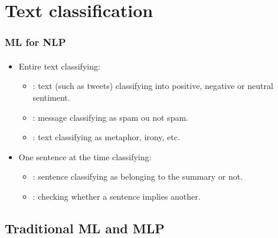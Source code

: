 \documentclass[xcolor=table]{beamer}
\begin{document}
	
	\section{Text classification}
	
	\begin{frame}
		\frametitle{ML for NLP}
		\framesubtitle{\insertsection}
		
		\begin{itemize}
			\item Entire text classifying:
			\begin{itemize}
				\item {}: text (such as tweets) classifying into positive, negative or neutral sentiment.
				\item {}: message classifying as spam ou not spam.
				\item {}: text classifying as metaphor, irony, etc.
			\end{itemize}
			\item One sentence at the time classifying:
			\begin{itemize}
				\item {}: sentence classifying as belonging to the summary or not.
				\item {}: checking whether a sentence implies another.
			\end{itemize}
		\end{itemize}
		
	\end{frame}
	
	\subsection{Traditional ML and MLP}
	
\end{document}
